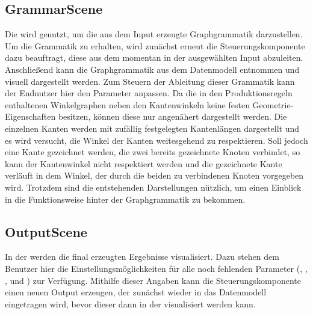 \subsection{GrammarScene}
Die  wird genutzt, um die aus dem Input erzeugte Graphgrammatik darzustellen. Um die Grammatik zu erhalten, wird
zunächst erneut die Steuerungskomponente dazu beauftragt, diese aus dem momentan in der  ausgewählten Input abzuleiten.
Anschließend kann die Graphgrammatik aus dem Datenmodell entnommen und visuell dargestellt werden. Zum Steuern der Ableitung dieser
Grammatik kann der Endnutzer hier den Parameter  anpassen. Da die in den
Produktionsregeln enthaltenen Winkelgraphen neben den Kantenwinkeln keine festen Geometrie-Eigenschaften besitzen, können diese nur
angenähert dargestellt werden. Die einzelnen Kanten werden mit zufällig festgelegten Kantenlängen dargestellt und es wird versucht, die
Winkel der Kanten weitesgehend zu respektieren. Soll jedoch eine Kante gezeichnet werden, die zwei bereits gezeichnete Knoten verbindet,
so kann der Kantenwinkel nicht respektiert werden und die gezeichnete Kante verläuft in dem Winkel, der durch die beiden zu verbindenen
Knoten vorgegeben wird. Trotzdem sind die entstehenden Darstellungen nützlich, um einen Einblick in die Funktionsweise hinter der
Graphgrammatik zu bekommen.

\subsection{OutputScene}
In der  werden die final erzeugten Ergebnisse visualisiert. Dazu stehen dem Benutzer hier die Einstellungsmöglichkeiten
für alle noch fehlenden Parameter (, , ,  und ) zur
Verfügung. Mithilfe dieser Angaben kann die Steuerungskomponente einen neuen Output erzeugen, der zunächst wieder in das Datenmodell
eingetragen wird, bevor dieser dann in der  visualisiert werden kann.
